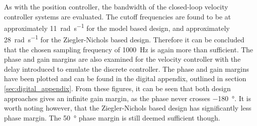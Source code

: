 \documentclass[../../main.tex]{subfiles}
\begin{document}
As with the position controller, the bandwidth of the closed-loop velocity controller systems are evaluated. The cutoff frequencies are found to be at approximately \SI{11}{\radian \per \second} for the model based design, and approximately \SI{28}{\radian \per \second} for the Ziegler-Nichols based design. Therefore it can be concluded that the chosen sampling frequency of \SI{1000}{\hertz} is again more than sufficient. 
The phase and gain margins are also examined for the velocity controller with the delay introduced to emulate the discrete controller. The phase and gain margins have been plotted and can be found in the digital appendix, outlined in section \ref{sec:digital_appendix}. From these figures, it can be seen that both design approaches gives an infinite gain margin, as the phase never crosses \SI{-180}{\degree}. It is worth noting however, that the Ziegler-Nichols based design has significantly less phase margin. The \SI{50}{\degree} phase margin is still deemed sufficient though.

\end{document}
